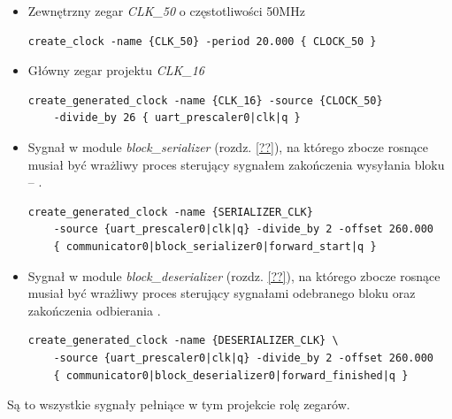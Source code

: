 \begin{itemize}
\item Zewnętrzny zegar \textit{CLK\_50} o częstotliwości 50MHz
\begin{lstlisting}[basicstyle=\footnotesize]
create_clock -name {CLK_50} -period 20.000 { CLOCK_50 }
\end{lstlisting}

\item Główny zegar projektu \textit{CLK\_16}
\begin{lstlisting}[basicstyle=\footnotesize]
create_generated_clock -name {CLK_16} -source {CLOCK_50} 
	-divide_by 26 { uart_prescaler0|clk|q }
\end{lstlisting}

\item Sygnał w module \textit{block\_serializer} (rozdz. \ref{??}), na którego zbocze rosnące musiał być wrażliwy proces sterujący sygnałem zakończenia wysyłania bloku -- .
\begin{lstlisting}[basicstyle=\footnotesize]
create_generated_clock -name {SERIALIZER_CLK} 
	-source {uart_prescaler0|clk|q} -divide_by 2 -offset 260.000 
	{ communicator0|block_serializer0|forward_start|q }
\end{lstlisting}

\item Sygnał w module \textit{block\_deserializer} (rozdz. \ref{??}), na którego zbocze rosnące musiał być wrażliwy proces sterujący sygnałami odebranego bloku  oraz zakończenia odbierania .
\begin{lstlisting}[basicstyle=\footnotesize]
create_generated_clock -name {DESERIALIZER_CLK} \
	-source {uart_prescaler0|clk|q} -divide_by 2 -offset 260.000 
	{ communicator0|block_deserializer0|forward_finished|q }
\end{lstlisting}

\end{itemize}

Są to wszystkie sygnały pełniące w tym projekcie rolę zegarów.













\newpage